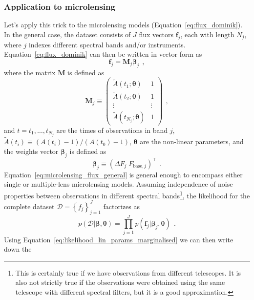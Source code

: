 \documentclass[12pt,dvipsnames]{report}
\renewcommand{\vec}[1]{\boldsymbol{\mathbf{#1}}}
\newcommand{\hquad}{~~}
\begin{document}
\subsubsection{Application to microlensing}
Let's apply this trick to the microlensing models
(Equation~\ref{eq:flux_dominik}). In the general case, the dataset consists of
$J$ flux vectors $\vec{f}_j$, each with length $N_j$, where $j$ indexes different
spectral bands and/or instruments.
Equation~\ref{eq:flux_dominik} can then be written in vector form as
\begin{equation}
    \vec{f}_j=\vec{M}_j\vec\beta_j
    \hquad,
    \label{eq:microlensing_flux_general}
\end{equation}
where the matrix $\vec{M}$ is defined as
\begin{equation}
    \vec{M}_j\equiv \begin{pmatrix}
        \tilde{A}(t_1;\vec{\theta})     & 1      \\
        \tilde{A}(t_2;\vec{\theta})     & 1      \\
        \vdots                          & \vdots \\
        \tilde{A}(t_{N_j};\vec{\theta}) & 1
    \end{pmatrix}
    \hquad,
\end{equation}
and $t=t_1,\ldots, t_{N_j}$ are the times of observations in band $j$,
$\tilde{A}(t_i) \equiv (A(t_i)-1) /(A\left(t_{0}\right)-1)$, $\vec{\theta}$ are the
non-linear parameters, and the weights vector $\vec\beta_j$ is defined as
\begin{equation}
    \vec\beta_j\equiv    \left( \Delta F_j\; F_{\mathrm{base},j}\right)^\intercal
    \hquad.
\end{equation}
Equation~\ref{eq:microlensing_flux_general} is general enough to encompass
either single or multiple-lens microlensing models. Assuming independence of
noise properties between observations in different spectral bands\footnote{This
    is certainly true if we have observations from different telescopes. It is also not
    strictly true if the observations were obtained using the same telescope  with different
    spectral filters, but it is a good approximation.}, the likelihood for
the complete dataset
$\mathcal{D}=\left\{f_{j}\right\}_{j=1}^{J}$ factorizes as
\begin{equation}
    p(\mathcal{D}\lvert \vec\beta, \vec{\theta})=\prod_{j=1}^J p(\vec{f}_j\lvert \vec\beta_j, \vec{\theta})
    \hquad.
\end{equation}
Using Equation~\ref{eq:likelihood_lin_params_marginalised} we can then write down the
\end{document}
